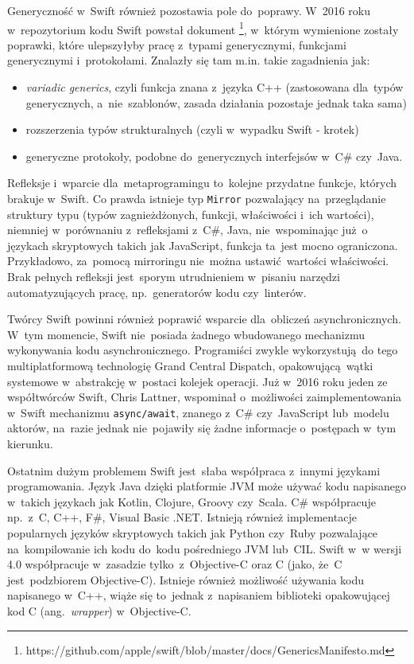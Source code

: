 \documentclass[mgr, shortabstract]{iithesis}
\newcommand{\ang}[1]{ang.~\textit{#1}}
\newcommand{\swiftinline}[1]{
    \texttt{#1}
}
\begin{document}
Generyczność w~Swift również pozostawia pole do~poprawy. W~2016 roku w~repozytorium kodu Swift powstał dokument \footnote{https://github.com/apple/swift/blob/master/docs/GenericsManifesto.md}, w~którym wymienione zostały poprawki, które ulepszyłyby pracę z~typami generycznymi, funkcjami generycznymi i~protokołami. Znalazły się tam m.in. takie zagadnienia jak:
\begin{itemize}
    \item \textit{variadic generics}, czyli funkcja znana z~języka C++ (zastosowana dla~typów generycznych, a~nie~szablonów, zasada działania pozostaje jednak taka sama)
    \item rozszerzenia typów strukturalnych (czyli w~wypadku Swift - krotek)
    \item generyczne protokoły, podobne do~generycznych interfejsów w~C\# czy~Java.
\end{itemize}

Refleksje i~wparcie dla~metaprogramingu to~kolejne przydatne funkcje, których brakuje w~Swift. Co prawda istnieje typ \swiftinline{Mirror} pozwalający na~przeglądanie struktury typu (typów zagnieżdżonych, funkcji, właściwości i~ich wartości), niemniej w~porównaniu z~refleksjami z~C\#, Java, nie~wspominając już o językach skryptowych takich jak JavaScript, funkcja ta~jest mocno ograniczona. Przykładowo, za~pomocą mirroringu nie~można ustawić wartości właściwości. Brak pełnych refleksji jest~sporym utrudnieniem w~pisaniu narzędzi automatyzujących pracę, np.~generatorów kodu czy~linterów.

Twórcy Swift powinni również poprawić wsparcie dla~obliczeń asynchronicznych. W~tym momencie, Swift nie~posiada żadnego wbudowanego mechanizmu wykonywania kodu asynchronicznego. Programiści zwykle wykorzystują do tego multiplatformową technologię Grand Central Dispatch, opakowującą wątki systemowe w~abstrakcję w~postaci kolejek operacji. Już w~2016 roku jeden ze współtwórców Swift, Chris Lattner, wspominał o~możliwości zaimplementowania w~Swift mechanizmu \texttt{async/await}, znanego z~C\# czy~JavaScript lub~modelu aktorów, na~razie jednak nie~pojawiły się żadne informacje o~postępach w~tym kierunku.

Ostatnim dużym problemem Swift jest~słaba współpraca z~innymi językami programowania. Język Java dzięki platformie JVM może używać kodu napisanego w~takich językach jak Kotlin, Clojure, Groovy czy~Scala. C\# współpracuje np.~z~C, C++, F\#, Visual Basic .NET. Istnieją również implementacje popularnych języków skryptowych takich jak Python czy~Ruby pozwalające na~kompilowanie ich kodu do~kodu pośredniego JVM lub~CIL. Swift w~w wersji 4.0 współpracuje w~zasadzie tylko~z~Objective-C oraz C (jako, że~C jest~podzbiorem Objective-C). Istnieje również możliwość używania kodu napisanego w~C++, wiąże się to~jednak z~napisaniem biblioteki opakowującej kod C (\ang{wrapper}) w~Objective-C.
\end{document}
